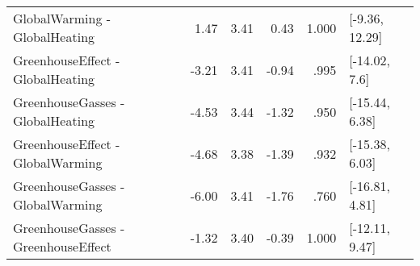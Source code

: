 \begin{table}[ht]
\begin{tabular}{lrrrrl}
  GlobalWarming - GlobalHeating & 1.47 & 3.41 & 0.43 & 1.000 & [-9.36, 12.29] \\ 
  GreenhouseEffect - GlobalHeating & -3.21 & 3.41 & -0.94 & .995 & [-14.02, 7.6] \\ 
  GreenhouseGasses - GlobalHeating & -4.53 & 3.44 & -1.32 & .950 & [-15.44, 6.38] \\ 
  GreenhouseEffect - GlobalWarming & -4.68 & 3.38 & -1.39 & .932 & [-15.38, 6.03] \\ 
  GreenhouseGasses - GlobalWarming & -6.00 & 3.41 & -1.76 & .760 & [-16.81, 4.81] \\ 
  GreenhouseGasses - GreenhouseEffect & -1.32 & 3.40 & -0.39 & 1.000 & [-12.11, 9.47] \\ 
   \hline
\end{tabular}
\end{table}
